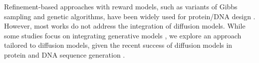Refinement-based approaches with reward models, such as variants of Gibbs sampling and genetic algorithms, have been widely used for protein/DNA design \citep{anishchenko2021novo,jendrusch2021alphadesign,hie2022high,gosai2023machine,pacesa2024bindcraft}. However, most works do not address the integration of diffusion models. While some studies focus on integrating generative models \citep{hie2024efficient,chen2024llms}, we explore an approach tailored to diffusion models, given the recent success of diffusion models in protein and DNA sequence generation \citep{alamdari2023protein,wang2024dplm}.